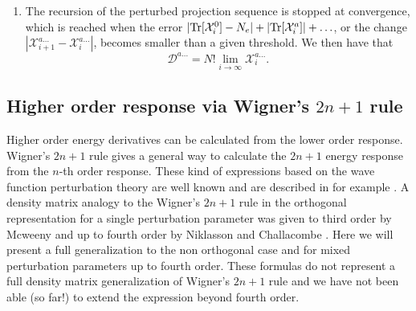 \documentclass[prl,aps,letterpaper,twocolumn,showpacs,twocolumngrid,superbib]{revtex4}
\def\Tr{{\rm Tr}}
\def\D{\mathcal{D}}
\def\X{\mathcal{X}}
\begin{document}
\begin{enumerate}
\item The recursion of the perturbed projection sequence is
  stopped at convergence, which is reached when the error
  $|\Tr[\X^0_{i}]-N_e| + |\Tr[\X^{a}_{i}]| + \ldots$, or 
  the change $|\X^{a\ldots}_{i+1}-\X^{a\ldots}_{i}|$,
  becomes smaller than a given threshold. We then have that 
\begin{equation}
  \D^{a...} = N!\lim_{i\rightarrow\infty} \X_i^{a...}.
\end{equation}

\end{enumerate}





\subsection{Higher order response via Wigner's $2n+1$ rule }

Higher order energy derivatives can be calculated from the lower
order response. Wigner's $2n+1$ rule gives a general way to calculate the $2n+1$
energy response from the $n$-th order response. These kind of expressions
based on the wave function perturbation theory are well known and are 
described in for example \cite{Dupuis_1991}.
A density matrix analogy to the Wigner's $2n+1$ rule in the orthogonal 
representation for a single perturbation parameter
was given to third order by Mcweeny \cite{RMcWeeny62}
and up to fourth order by Niklasson and Challacombe \cite{ANiklasson04}.
Here we will present a full generalization to the non orthogonal case 
and for mixed perturbation parameters up to fourth order. These formulas
do not represent a full density matrix generalization of Wigner's $2n+1$ 
rule and we have not been able (so far!) to extend the expression beyond 
fourth order. 
\end{document}
